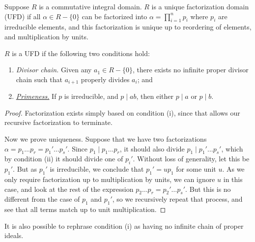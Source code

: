 \begin{definition}
    Suppose \(R\) is a commutative integral domain.
    \(R\) is a unique factorization domain (UFD)
    if all \(\alpha \in R - \{0\}\) can be factorized into
    \(\alpha = \prod_{i=1}^n p_i\) where \(p_i\) are irreducible elements,
    and this factorization is unique up to reordering of elements,
    and multiplication by units.
\end{definition}
\begin{theorem}\label{thm:ufd-conditions}
    \(R\) is a UFD if the following two conditions hold:
    \begin{enumerate}[label={(\roman*)}, itemsep=0mm]
        \item \textit{Divisor chain.}
            Given any \(a_1 \in R - \{0\}\),
            there exists no infinite proper divisor chain
            such that \(a_{i+1}\) properly divides \(a_i\); and
        \item \textit{\hyperref[lem:euclid]{Primeness.}}
            If \(p\) is irreducible, and \(p \mid ab\),
            then either \(p \mid a\) or \(p \mid b\).
    \end{enumerate}
\end{theorem}
\begin{proof}
    Factorization exists simply based on condition (i),
    since that allows our recursive factorization to terminate.

    Now we prove uniqueness.
    Suppose that we have two factorizations
    \(\alpha = p_1 \hdots p_r = p_1' \hdots p_s'\).
    Since \(p_1 \mid p_1 \hdots p_r\),
    it should also divide \(p_1 \mid p_1' \hdots p_s'\),
    which by condition (ii) it should divide one of \(p_i'\).
    Without loss of generality, let this be \(p_1'\).
    But as \(p_1'\) is irreducible,
    we conclude that \(p_1' = up_1\) for some unit \(u\).
    As we only require factorization up to multiplication by units,
    we can ignore \(u\) in this case,
    and look at the rest of the expression \(p_2 \hdots p_r = p_2' \hdots p_s'\).
    But this is no different from the case of \(p_1\) and \(p_1'\),
    so we recursively repeat that process,
    and see that all terms match up to unit multiplication.
\end{proof}
\begin{remark}
    It is also possible to rephrase condition (i)
    as having no infinite chain of proper ideals.
\end{remark}


